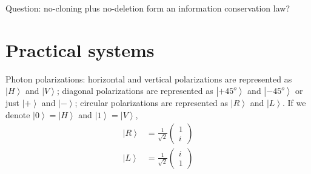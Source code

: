 \documentclass[onecolumn,pra,superscriptaddress,nofootinbib]{revtex4-1}
\newcommand{\ket}[1]{\mbox{$\left| #1 \right\rangle$}}
\begin{document}
Question: no-cloning plus no-deletion form an information conservation law?


\section{Practical systems}
Photon polarizations: horizontal and vertical polarizations are represented as $\ket{H}$ and $\ket{V}$; diagonal polarizations are represented as $\ket{+45^o}$ and $\ket{-45^o}$ or just $\ket{+}$ and $\ket{-}$; circular polarizations are represented as $\ket{R}$ and $\ket{L}$. If we denote $\ket{0}=\ket{H}$ and $\ket{1}=\ket{V}$,
\begin{equation} \label{1qubit:polar}
\begin{aligned}
\ket{R} &= \frac{1}{\sqrt2} \begin{pmatrix}1\\i\end{pmatrix} \\
\ket{L} &= \frac{1}{\sqrt2} \begin{pmatrix}i\\1\end{pmatrix} \\
\end{aligned}
\end{equation}




%
%




\end{document}
